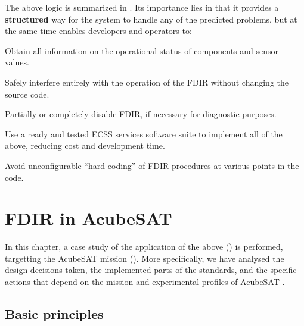 \documentclass[a4paper,nobib]{tufte-book}
\begin{document}
The above logic is summarized in . Its importance lies in that it provides a \textbf{structured} way for the system to handle any of the predicted problems, but at the same time enables developers and operators to:
\begin{compactitem}
	\item Obtain all information on the operational status of components and sensor values.
	\item Safely interfere entirely with the operation of the \acs{FDIR} without changing the source code.
	\item Partially or completely disable \acs{FDIR}, if necessary for diagnostic purposes.
	\item Use a ready and tested \acs{ECSS} services software suite to implement all of the above, reducing cost and development time.
	\item Avoid unconfigurable ``hard-coding'' of \acs{FDIR} procedures at various points in the code.
\end{compactitem}

\chapter{\acs{FDIR} in AcubeSAT}
\label{cap:acufdir}

In this chapter, a case study of the application of the above () is performed, targetting the AcubeSAT mission (). More specifically, we have analysed the design decisions taken, the implemented parts of the standards, and the specific actions that depend on the mission and experimental profiles of AcubeSAT \autocite{FMEA}.


\section{Basic principles}
\label{sec:fdirbaspri}
\end{document}
